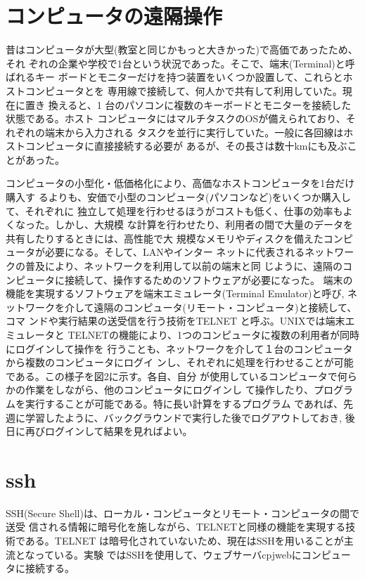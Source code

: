 \section{コンピュータの遠隔操作}
昔はコンピュータが大型(教室と同じかもっと大きかった)で高価であったため、それ
ぞれの企業や学校で1台という状況であった。そこで、端末(Terminal)と呼ばれるキー
ボードとモニターだけを持つ装置をいくつか設置して、これらとホストコンピュータとを
専用線で接続して、何人かで共有して利用していた。現在に置き
換えると、1 台のパソコンに複数のキーボードとモニターを接続した状態である。ホスト
コンピュータにはマルチタスクのOSが備えられており、それぞれの端末から入力される
タスクを並行に実行していた。一般に各回線はホストコンピュータに直接接続する必要が
あるが、その長さは数十kmにも及ぶことがあった。

コンピュータの小型化・低価格化により、高価なホストコンピュータを1台だけ購入す
るよりも、安価で小型のコンピュータ(パソコンなど)をいくつか購入して、それぞれに
独立して処理を行わせるほうがコストも低く、仕事の効率もよくなった。しかし、大規模
な計算を行わせたり、利用者の間で大量のデータを共有したりするときには、高性能で大
規模なメモリやディスクを備えたコンピュータが必要になる。そして、LANやインター
ネットに代表されるネットワークの普及により、ネットワークを利用して以前の端末と同
じように、遠隔のコンピュータに接続して、操作するためのソフトウェアが必要になった。
端末の機能を実現するソフトウェアを端末エミュレータ(Terminal Emulator)と呼び,
ネットワークを介して遠隔のコンピュータ(リモート・コンピュータ)と接続して、コマ
ンドや実行結果の送受信を行う技術をTELNET と呼ぶ。UNIXでは端末エミュレータと
TELNETの機能により、1つのコンピュータに複数の利用者が同時にログインして操作を
行うことも、ネットワークを介して１台のコンピュータから複数のコンピュータにログイ
ンし、それぞれに処理を行わせることが可能である。この様子を図2に示す。各自、自分
が使用しているコンピュータで何らかの作業をしながら、他のコンピュータにログインし
て操作したり、プログラムを実行することが可能である。特に長い計算をするプログラム
であれば、先週に学習したように、バックグラウンドで実行した後でログアウトしておき,
後日に再びログインして結果を見ればよい。


\section{ssh}

SSH(Secure Shell)は、ローカル・コンピュータとリモート・コンピュータの間で送受
信される情報に暗号化を施しながら、TELNETと同様の機能を実現する技術である。TELNET
は暗号化されていないため、現在はSSHを用いることが主流となっている。実験
ではSSHを使用して、ウェブサーバcpjwebにコンピュータに接続する。

